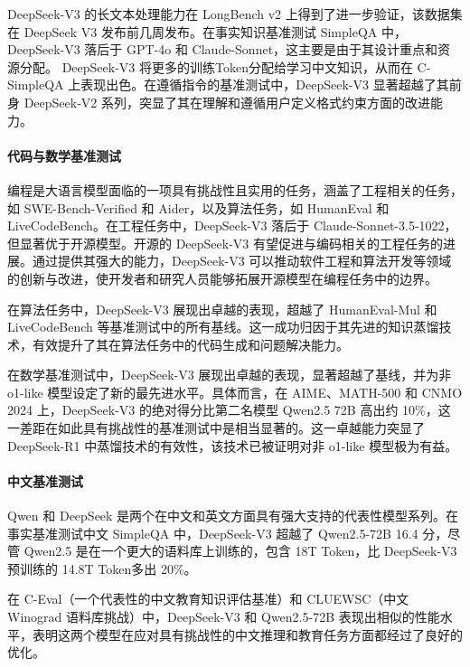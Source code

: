 \documentclass[lang=cn,a4paper,newtx]{elegantpaper}
\newcommand{\dsvii}{DeepSeek-V2}
\newcommand{\dsviii}{DeepSeek-V3}
\begin{document}
\dsviii{} 的长文本处理能力在 LongBench v2 上得到了进一步验证，该数据集在 DeepSeek V3 发布前几周发布。在事实知识基准测试 SimpleQA 中，\dsviii{} 落后于 GPT-4o 和 Claude-Sonnet，这主要是由于其设计重点和资源分配。 \dsviii{} 将更多的训练Token分配给学习中文知识，从而在 C-SimpleQA 上表现出色。在遵循指令的基准测试中，\dsviii{} 显著超越了其前身 \dsvii{} 系列，突显了其在理解和遵循用户定义格式约束方面的改进能力。

\paragraph{代码与数学基准测试}
编程是大语言模型面临的一项具有挑战性且实用的任务，涵盖了工程相关的任务，如 SWE-Bench-Verified 和 Aider，以及算法任务，如 HumanEval 和 LiveCodeBench。在工程任务中，\dsviii{} 落后于 Claude-Sonnet-3.5-1022，但显著优于开源模型。开源的 \dsviii{} 有望促进与编码相关的工程任务的进展。通过提供其强大的能力，\dsviii{} 可以推动软件工程和算法开发等领域的创新与改进，使开发者和研究人员能够拓展开源模型在编程任务中的边界。

在算法任务中，\dsviii{} 展现出卓越的表现，超越了 HumanEval-Mul 和 LiveCodeBench 等基准测试中的所有基线。这一成功归因于其先进的知识蒸馏技术，有效提升了其在算法任务中的代码生成和问题解决能力。

在数学基准测试中，\dsviii{} 展现出卓越的表现，显著超越了基线，并为非 o1-like 模型设定了新的最先进水平。具体而言，在 AIME、MATH-500 和 CNMO 2024 上，\dsviii{} 的绝对得分比第二名模型 Qwen2.5 72B 高出约 10\%，这一差距在如此具有挑战性的基准测试中是相当显著的。这一卓越能力突显了 DeepSeek-R1 中蒸馏技术的有效性，该技术已被证明对非 o1-like 模型极为有益。

\paragraph{中文基准测试}
Qwen 和 DeepSeek 是两个在中文和英文方面具有强大支持的代表性模型系列。在事实基准测试中文 SimpleQA 中，\dsviii{} 超越了 Qwen2.5-72B 16.4 分，尽管 Qwen2.5 是在一个更大的语料库上训练的，包含 18T Token，比 \dsviii{} 预训练的 14.8T Token多出 20\%。

在 C-Eval（一个代表性的中文教育知识评估基准）和 CLUEWSC（中文 Winograd 语料库挑战）中，\dsviii{} 和 Qwen2.5-72B 表现出相似的性能水平，表明这两个模型在应对具有挑战性的中文推理和教育任务方面都经过了良好的优化。
\end{document}
